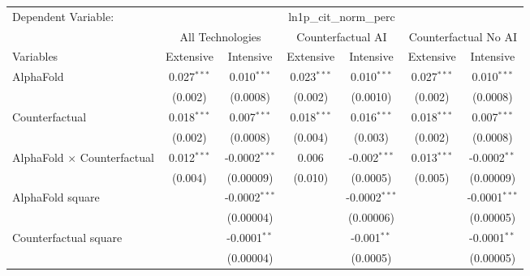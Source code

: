 \begingroup
\centering
\begin{tabular}{lcccccc}
   \tabularnewline \midrule \midrule
   Dependent Variable: & \multicolumn{6}{c}{ln1p\_cit\_norm\_perc}\\
 & \multicolumn{2}{c}{All Technologies} & \multicolumn{2}{c}{Counterfactual AI} & \multicolumn{2}{c}{Counterfactual No AI} \\
\cmidrule(lr){1-1}\cmidrule(lr){2-3} \cmidrule(lr){4-5} \cmidrule(lr){6-7}
Variables & \multicolumn{1}{c}{Extensive} & \multicolumn{1}{c}{Intensive} & \multicolumn{1}{c}{Extensive} & \multicolumn{1}{c}{Intensive} & \multicolumn{1}{c}{Extensive} & \multicolumn{1}{c}{Intensive} \\
\cmidrule(lr){1-1}\cmidrule(lr){2-2} \cmidrule(lr){3-3} \cmidrule(lr){4-4} \cmidrule(lr){5-5} \cmidrule(lr){6-6} \cmidrule(lr){7-7}
   AlphaFold                          & 0.027$^{***}$ & 0.010$^{***}$      & 0.023$^{***}$ & 0.010$^{***}$    & 0.027$^{***}$ & 0.010$^{***}$\\   
                                      & (0.002)       & (0.0008)           & (0.002)       & (0.0010)         & (0.002)       & (0.0008)\\   
   Counterfactual                     & 0.018$^{***}$ & 0.007$^{***}$      & 0.018$^{***}$ & 0.016$^{***}$    & 0.018$^{***}$ & 0.007$^{***}$\\   
                                      & (0.002)       & (0.0008)           & (0.004)       & (0.003)          & (0.002)       & (0.0008)\\   
   AlphaFold $\times$ Counterfactual  & 0.012$^{***}$ & -0.0002$^{***}$    & 0.006         & -0.002$^{***}$   & 0.013$^{***}$ & -0.0002$^{**}$\\   
                                      & (0.004)       & (0.00009)          & (0.010)       & (0.0005)         & (0.005)       & (0.00009)\\   
   AlphaFold square                   &               & -0.0002$^{***}$    &               & -0.0002$^{***}$  &               & -0.0001$^{***}$\\   
                                      &               & (0.00004)          &               & (0.00006)        &               & (0.00005)\\   
   Counterfactual square              &               & -0.0001$^{**}$     &               & -0.001$^{**}$    &               & -0.0001$^{**}$\\   
                                      &               & (0.00004)          &               & (0.0005)         &               & (0.00005)\\   

\end{tabular}
